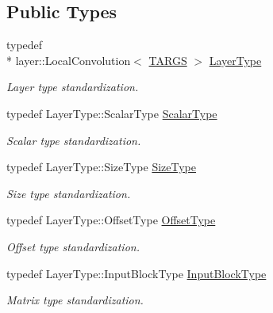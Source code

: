 \subsection*{Public Types}
\begin{DoxyCompactItemize}
\item 
typedef \\*
layer\-::\-Local\-Convolution$<$ \hyperlink{local__convolution_8hpp_a005b9b79411aa786124330e813a99057}{T\-A\-R\-G\-S} $>$ \hyperlink{classffnn_1_1optimizer_1_1_gradient_descent_3_01layer_1_1_local_convolution_3_01_t_a_r_g_s_01_4_01_4_a16ba9a242dbe61604f16ff2ae19a4d1f}{Layer\-Type}
\begin{DoxyCompactList}\small\item\em Layer type standardization. \end{DoxyCompactList}\item 
typedef Layer\-Type\-::\-Scalar\-Type \hyperlink{classffnn_1_1optimizer_1_1_gradient_descent_3_01layer_1_1_local_convolution_3_01_t_a_r_g_s_01_4_01_4_ac3250ac9d0d3a0529a7e18a00f00233f}{Scalar\-Type}
\begin{DoxyCompactList}\small\item\em Scalar type standardization. \end{DoxyCompactList}\item 
typedef Layer\-Type\-::\-Size\-Type \hyperlink{classffnn_1_1optimizer_1_1_gradient_descent_3_01layer_1_1_local_convolution_3_01_t_a_r_g_s_01_4_01_4_a710d6fff7052b3fc2f032ca74b0c3026}{Size\-Type}
\begin{DoxyCompactList}\small\item\em Size type standardization. \end{DoxyCompactList}\item 
typedef Layer\-Type\-::\-Offset\-Type \hyperlink{classffnn_1_1optimizer_1_1_gradient_descent_3_01layer_1_1_local_convolution_3_01_t_a_r_g_s_01_4_01_4_aef03166f60cff06f14ed5e36cf371a5e}{Offset\-Type}
\begin{DoxyCompactList}\small\item\em Offset type standardization. \end{DoxyCompactList}\item 
typedef Layer\-Type\-::\-Input\-Block\-Type \hyperlink{classffnn_1_1optimizer_1_1_gradient_descent_3_01layer_1_1_local_convolution_3_01_t_a_r_g_s_01_4_01_4_af401944b8f1e2b6ed6cea8b8211e25f7}{Input\-Block\-Type}
\begin{DoxyCompactList}\small\item\em Matrix type standardization. \end{DoxyCompactList}\item 

\end{DoxyCompactItemize}
